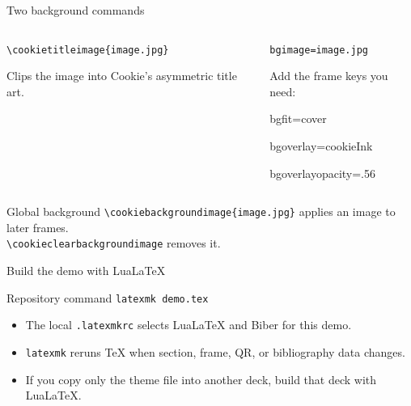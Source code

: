 \documentclass[aspectratio=169]{beamer}
\begin{document}
\begin{frame}{Two background commands}
  \begin{columns}[T,onlytextwidth]
      \begin{cookiecard}[title=Title-page wedge]
        \texttt{\textbackslash cookietitleimage\{image.jpg\}}

        \vspace{.45em}
        Clips the image into Cookie's asymmetric title art.
      \end{cookiecard}

      \begin{cookiecard}[title=Ordinary frames]
        \texttt{bgimage=image.jpg}

        \vspace{.45em}
        Add the frame keys you need:
        \par\vspace{.25em}
        {\ttfamily\small
          bgfit=cover\par
          bgoverlay=cookieInk\par
          bgoverlayopacity=.56\par
        }
      \end{cookiecard}
  \end{columns}

  \vfill
  \begin{block}{Global background}
    \texttt{\textbackslash cookiebackgroundimage\{image.jpg\}} applies an image to later frames.\\
    \texttt{\textbackslash cookieclearbackgroundimage} removes it.
  \end{block}
\end{frame}

\begin{frame}{Build the demo with LuaLaTeX}
  \vspace{.55em}

  \begin{block}{Repository command}
    \texttt{latexmk demo.tex}
  \end{block}

  \begin{itemize}
    \item The local \texttt{.latexmkrc} selects LuaLaTeX and Biber for this demo.
    \item \texttt{latexmk} reruns TeX when section, frame, QR, or bibliography data changes.
    \item If you copy only the theme file into another deck, build that deck with LuaLaTeX.
  \end{itemize}
\end{frame}
\end{document}
